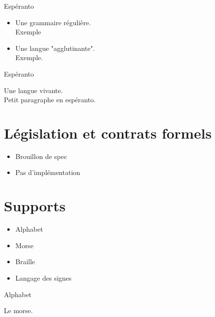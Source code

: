 \documentclass{beamer}
\begin{document}
\begin{frame}
\begin{center}
\huge Espéranto
\end{center}
\begin{itemize}
\item Une grammaire régulière.
\\ Exemple
\item Une langue "agglutinante".
\\ Exemple.
\end{itemize}
\end{frame}

\begin{frame}
\begin{center}
\huge Espéranto
\end{center}
Une langue vivante.
\\ Petit paragraphe en espéranto.
\end{frame}

\section[Contrats]{Législation et contrats formels}

\begin{frame}  
  \begin{itemize}
  \item Brouillon de spec
  \item Pas d'implémentation
  \end{itemize}
\end{frame}

\section{Supports}

\begin{frame}  
  \begin{itemize}
  \item Alphabet %
  \item Morse
  \item Braille
  \item Langage des signes
  \end{itemize}
\end{frame}

\begin{frame}  
  \Huge Alphabet
\end{frame}


\begin{frame}
  \Huge Le morse.
\end{frame}
\end{document}
